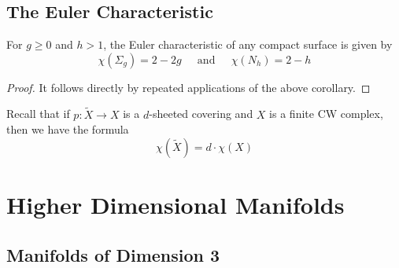 \documentclass[a4paper]{article}
\begin{document}
\subsection{The Euler Characteristic}
\begin{crl}{}{} For $g\geq 0$ and $h>1$, the Euler characteristic of any compact surface is given by $$\chi(\Sigma_g)=2-2g\;\;\;\;\text{ and }\;\;\;\;\chi(N_h)=2-h$$ \tcbline
\begin{proof}
It follows directly by repeated applications of the above corollary. 
\end{proof}
\end{crl}

Recall that if $p:\widetilde{X}\to X$ is a $d$-sheeted covering and $X$ is a finite CW complex, then we have the formula $$\chi(\widetilde{X})=d\cdot\chi(X)$$

\pagebreak
\section{Higher Dimensional Manifolds}
\subsection{Manifolds of Dimension 3}
\begin{thm}{}{}
\end{thm}
\end{document}
